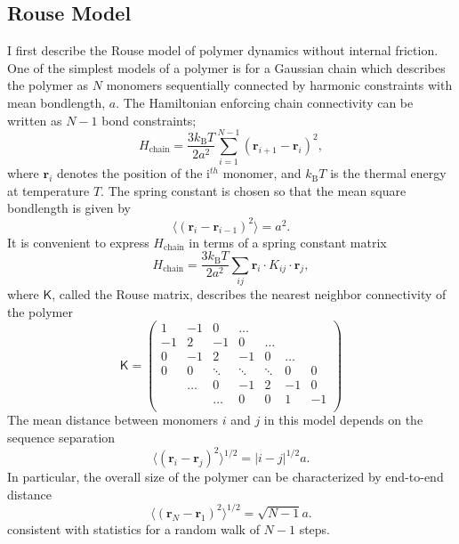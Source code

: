 \documentclass[../talant.diss.submit.tex]{subfiles}
\begin{document}
\subsection{\textbf{Rouse Model}}
I first describe the Rouse model of polymer dynamics without internal
friction.\cite{doi1988th} One of the simplest models of a polymer is
for a Gaussian chain which describes the polymer as
$N$ monomers sequentially connected by harmonic constraints with mean
bondlength, $a$. The Hamiltonian enforcing chain connectivity can be written
as $N-1$ bond constraints;
\begin{equation}
  \label{eq:gchain1}
  H_\mathrm{chain} = \frac{3 k_\mathrm{B}T}{2a^2} \sum_{i=1}^{N-1} (\mathbf{r}_{i+1} - \mathbf{r}_{i})^2,
\end{equation}
where $\mathbf{r}_i$ denotes the position of the i$^{th}$ monomer, and
$k_\mathrm{B}T$ is the thermal energy at temperature $T$.  The spring constant
is chosen so that the mean square bondlength is given by
\begin{equation}
  \label{eq:bond}
  \langle (\mathbf{r}_i - \mathbf{r}_{i-1})^2\rangle = a^2.
\end{equation}
It is convenient to express
$H_\mathrm{chain}$ in terms of a spring constant matrix
\begin{equation}
  \label{eq:gchain2}
  H_\mathrm{chain} = \frac{3 k_\mathrm{B}T}{2a^2}\sum_{ij} \mathbf{r}_i\cdot K_{ij}\cdot \mathbf{r}_{j},
\end{equation}
where $\bm{\mathsf{K}}$, called the Rouse matrix, describes the nearest neighbor
connectivity of the polymer
\begin{equation}
  \label{eq:rouse_mat}
  \bm{\mathsf{K}} = 
  \left(\begin{array}{cccccccccc}
    1 & -1 & 0 & \ldots\\
    -1 & 2 & -1 & 0 & \ldots  \\
    0 & -1 &  2 & -1 & 0 & \ldots\\
    0 & 0 & \ddots &  \ddots & \ddots & 0 &0  \\
    & \ldots &  0 & -1 &  2 & -1 & 0 \\
    & & \ldots & 0 & 0 &  1 & -1 \\
  \end{array}\right)
\end{equation}
The mean distance between monomers $i$ and $j$ in this model depends on the
sequence separation
\begin{equation}
  \label{eq:correlation}
    \langle (\mathbf{r}_i - \mathbf{r}_{j})^2\rangle^{1/2} = |i-j|^{1/2}a. 
  \end{equation}
  In particular, the overall size of the polymer can be characterized by
  end-to-end distance
\begin{equation}
  \label{eq:end-to-end-distance}
    \langle (\mathbf{r}_N - \mathbf{r}_{1})^2\rangle^{1/2} = \sqrt{N-1} a. 
  \end{equation}
consistent with statistics for a random walk of $N-1$ steps.
\end{document}
